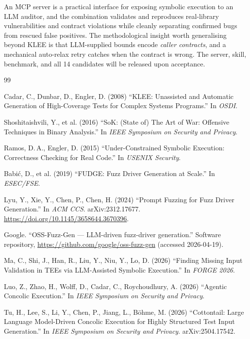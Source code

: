 \documentclass[3p,times,procedia]{elsarticle}
\begin{document}
An MCP server is a practical interface for exposing symbolic execution to an LLM auditor, and the combination validates and reproduces real-library vulnerabilities and contract violations while cleanly separating confirmed bugs from rescued false positives. The methodological insight worth generalising beyond KLEE is that LLM-supplied bounds encode \emph{caller contracts}, and a mechanical auto-relax retry catches when the contract is wrong. The server, skill, benchmark, and all 14 candidates will be released upon acceptance.


\begin{thebibliography}{99}

 Cadar, C., Dunbar, D., Engler, D. (2008) ``KLEE: Unassisted and Automatic Generation of High-Coverage Tests for Complex Systems Programs.'' In \emph{OSDI}.

 Shoshitaishvili, Y., et al. (2016) ``SoK: (State of) The Art of War: Offensive Techniques in Binary Analysis.'' In \emph{IEEE Symposium on Security and Privacy}.

 Ramos, D.\,A., Engler, D. (2015) ``Under-Constrained Symbolic Execution: Correctness Checking for Real Code.'' In \emph{USENIX Security}.

 Babi\'{c}, D., et al. (2019) ``FUDGE: Fuzz Driver Generation at Scale.'' In \emph{ESEC/FSE}.

 Lyu, Y., Xie, Y., Chen, P., Chen, H. (2024) ``Prompt Fuzzing for Fuzz Driver Generation.'' In \emph{ACM CCS}. arXiv:2312.17677. \url{https://doi.org/10.1145/3658644.3670396}.

 Google. ``OSS-Fuzz-Gen --- LLM-driven fuzz-driver generation.'' Software repository, \url{https://github.com/google/oss-fuzz-gen} (accessed 2026-04-19).

 Ma, C., Shi, J., Han, R., Liu, Y., Niu, Y., Lo, D. (2026) ``Finding Missing Input Validation in TEEs via LLM-Assisted Symbolic Execution.'' In \emph{FORGE 2026}.

 Luo, Z., Zhao, H., Wolff, D., Cadar, C., Roychoudhury, A. (2026) ``Agentic Concolic Execution.'' In \emph{IEEE Symposium on Security and Privacy}.

 Tu, H., Lee, S., Li, Y., Chen, P., Jiang, L., B\"{o}hme, M. (2026) ``Cottontail: Large Language Model-Driven Concolic Execution for Highly Structured Test Input Generation.'' In \emph{IEEE Symposium on Security and Privacy}. arXiv:2504.17542.


\end{thebibliography}
\end{document}
